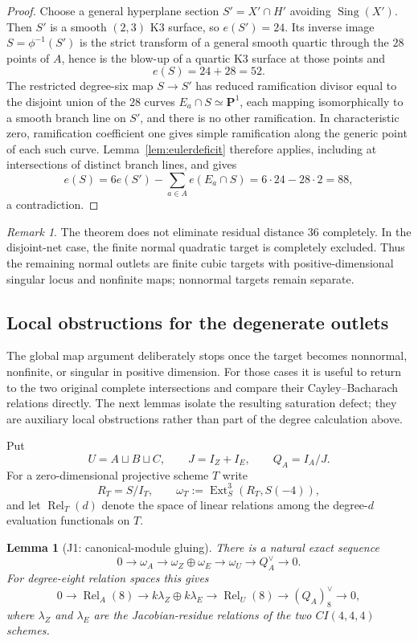 \documentclass[11pt,reqno]{amsart}
\newtheorem{lemma}[theorem]{Lemma}
\theoremstyle{remark}
\newtheorem{remark}[theorem]{Remark}
\newcommand{\PP}{\mathbf P}
\newcommand{\Rel}{\operatorname{Rel}}
\begin{document}
\begin{proof}
Choose a general hyperplane section $S'=X'\cap H'$ avoiding $\operatorname{Sing}(X')$.  Then $S'$ is a smooth $(2,3)$ K3 surface, so $e(S')=24$.  Its inverse image $S=\phi^{-1}(S')$ is the strict transform of a general smooth quartic through the $28$ points of $A$, hence is the blow-up of a quartic K3 surface at those points and
\[
e(S)=24+28=52.
\]
The restricted degree-six map $S\to S'$ has reduced ramification divisor equal to the disjoint union of the $28$ curves $E_a\cap S\simeq\PP^1$, each mapping isomorphically to a smooth branch line on $S'$, and there is no other ramification.  In characteristic zero, ramification coefficient one gives simple ramification along the generic point of each such curve.  Lemma~\ref{lem:eulerdeficit} therefore applies, including at intersections of distinct branch lines, and gives
\[
e(S)=6e(S')-\sum_{a\in A}e(E_a\cap S)
=6\cdot24-28\cdot2=88,
\]
a contradiction.
\end{proof}

\begin{remark}
The theorem does not eliminate residual distance $36$ completely.  In the disjoint-net case, the finite normal quadratic target is completely excluded.  Thus the remaining normal outlets are finite cubic targets with positive-dimensional singular locus and nonfinite maps; nonnormal targets remain separate.
\end{remark}

\subsection{Local obstructions for the degenerate outlets}
The global map argument deliberately stops once the target becomes nonnormal, nonfinite, or singular in positive dimension.  For those cases it is useful to return to the two original complete intersections and compare their Cayley--Bacharach relations directly.  The next lemmas isolate the resulting saturation defect; they are auxiliary local obstructions rather than part of the degree calculation above.

Put
\[
U=A\sqcup B\sqcup C,
\qquad
J=I_Z+I_E,
\qquad
Q_A=I_A/J.
\]
For a zero-dimensional projective scheme $T$ write
\[
R_T=S/I_T,
\qquad
\omega_T:=\operatorname{Ext}^3_S(R_T,S(-4)),
\]
and let $\Rel_T(d)$ denote the space of linear relations among the degree-$d$ evaluation functionals on $T$.

\begin{lemma}[J1: canonical-module gluing]\label{lem:J1}
There is a natural exact sequence
\[
0\to\omega_A\to\omega_Z\oplus\omega_E\to\omega_U\to Q_A^\vee\to0.
\]
For degree-eight relation spaces this gives
\[
0\to\Rel_A(8)\to k\lambda_Z\oplus k\lambda_E\to\Rel_U(8)\to(Q_A)_8^\vee\to0,
\]
where $\lambda_Z$ and $\lambda_E$ are the Jacobian-residue relations of the two $CI(4,4,4)$ schemes.
\end{lemma}
\end{document}
